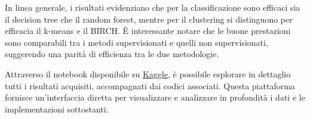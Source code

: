 \bigskip

In linea generale, i risultati evidenziano che per la classificazione sono efficaci sia il decision tree che il random forest, mentre per il clustering si distinguono per efficacia il k-means e il BIRCH. È interessante notare che le buone prestazioni sono comparabili tra i metodi supervisionati e quelli non supervisionati, suggerendo una parità di efficienza tra le due metodologie.

\bigskip

Attraverso il notebook disponibile su \href{https://www.kaggle.com/code/robertovicario/swell-kw-stress-detection}{\underline{Kaggle}}, è possibile esplorare in dettaglio tutti i risultati acquisiti, accompagnati dai codici associati. Questa piattaforma fornisce un'interfaccia diretta per visualizzare e analizzare in profondità i dati e le implementazioni sottostanti.